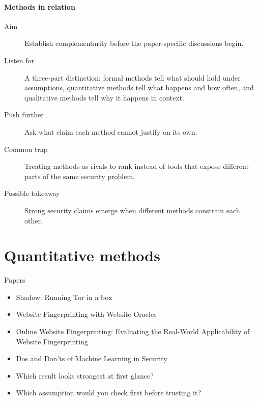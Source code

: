 \paragraph{Methods in relation}
\begin{description}
  \item[Aim] Establish complementarity before the paper-specific discussions
    begin.
  \item[Listen for] A three-part distinction: formal methods tell what should
    hold under assumptions, quantitative methods tell what happens and how
    often, and qualitative methods tell why it happens in context.
  \item[Push further] Ask what claim each method cannot justify on its own.
  \item[Common trap] Treating methods as rivals to rank instead of tools that
    expose different parts of the same security problem.
  \item[Possible takeaway] Strong security claims emerge when different methods
    constrain each other.
\end{description}

\section{Quantitative methods}

\begin{frame}
  \begin{block}{Papers}
    \begin{itemize}
      \item Shadow: Running Tor in a box
      \item Website Fingerprinting with Website Oracles
      \item Online Website Fingerprinting: Evaluating the Real-World
        Applicability of Website Fingerprinting
      \item Dos and Don'ts of Machine Learning in Security
    \end{itemize}
  \end{block}

  \begin{question}
    \begin{itemize}
      \item Which result looks strongest at first glance?
      \item Which assumption would you check first before trusting it?
    \end{itemize}
  \end{question}
\end{frame}

